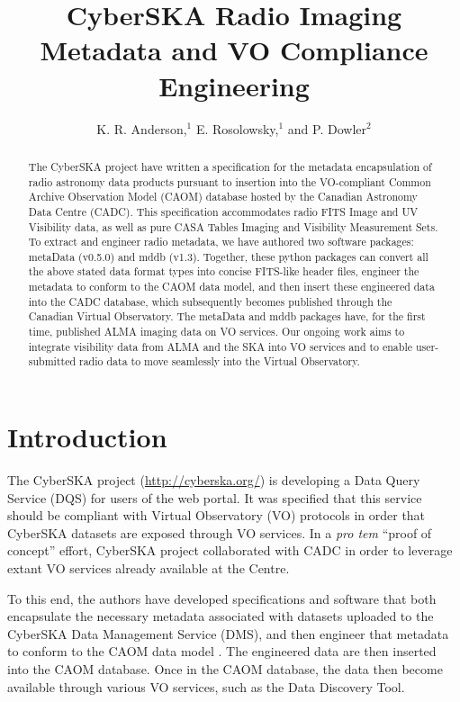 \documentclass[11pt,twoside]{article}
\begin{document}
\title{CyberSKA Radio Imaging Metadata and VO Compliance Engineering}
\author{K. R. Anderson,$^1$ E. Rosolowsky,$^1$ and P. Dowler$^2$
}

\begin{abstract}
The CyberSKA project have written a specification for the metadata
encapsulation of radio astronomy data products pursuant to insertion
into the VO-compliant Common Archive Observation Model (CAOM) database
hosted by the Canadian Astronomy Data Centre (CADC). This
specification accommodates radio FITS Image and UV Visibility data, as
well as pure CASA Tables Imaging and Visibility Measurement Sets. To
extract and engineer radio metadata, we have authored two software
packages: metaData (v0.5.0) and mddb (v1.3). Together, these python
packages can convert all the above stated data format types into
concise FITS-like header files, engineer the metadata to conform to
the CAOM data model, and then insert these engineered data into the
CADC database, which subsequently becomes published through the
Canadian Virtual Observatory. The metaData and mddb packages have, for
the first time, published ALMA imaging data on VO services. Our
ongoing work aims to integrate visibility data from ALMA and the SKA
into VO services and to enable user-submitted radio data to move
seamlessly into the Virtual Observatory. 
\end{abstract}

\section{Introduction}
The CyberSKA project  (\url{http://cyberska.org/}) is
developing a Data Query Service (DQS) for users of the web portal. It
was specified that this service should be compliant with Virtual
Observatory (VO) protocols in order that CyberSKA datasets are exposed
through VO services. In a \textit{pro tem} ``proof of concept'' effort,
CyberSKA project collaborated with CADC in order to leverage extant VO
services already available at the Centre.

To this end, the authors have developed  specifications and software
that both encapsulate the necessary metadata associated with datasets
uploaded to the  CyberSKA Data Management Service (DMS), and then
engineer that metadata to conform to the CAOM data
model \citep{dowler_2007}. The engineered data are then inserted into
the CAOM database. Once in the CAOM database, the data then become
available through various VO services, such as the Data Discovery Tool. 
\end{document}
